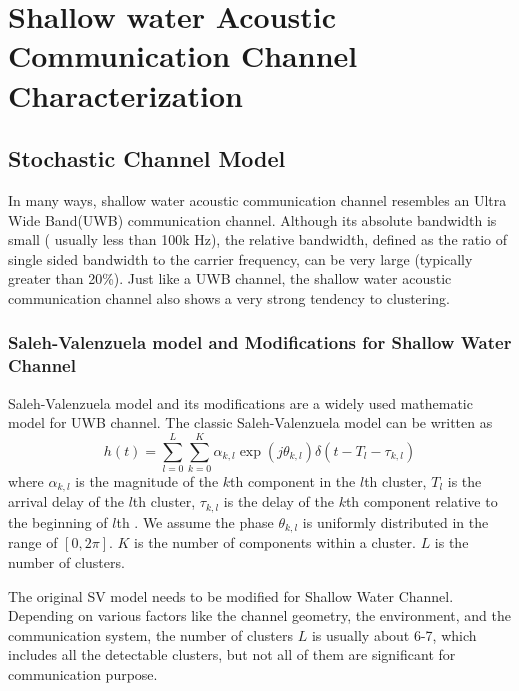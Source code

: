 
\chapter{Shallow water Acoustic Communication Channel Characterization}

\section{Stochastic Channel Model}
In many ways, shallow water acoustic communication channel resembles
an Ultra Wide Band(UWB) communication channel. Although its absolute
bandwidth is small ( usually less than 100k Hz), the relative
bandwidth, defined as the ratio of single sided bandwidth to the
carrier frequency, can be very large (typically greater than 20\%).
Just like a UWB channel, the shallow water acoustic communication
channel also shows a very strong tendency to clustering.

\subsection{Saleh-Valenzuela model and Modifications for Shallow
Water Channel}

Saleh-Valenzuela model and its modifications are a widely used
mathematic model for UWB channel. The classic Saleh-Valenzuela model
can be written as
\begin{equation}
h(t)=\sum_{l=0}^{L}\sum_{k=0}^{K}\alpha_{k,l}\exp(j\theta_{k,l})\delta(t-T_l-\tau_{k,l})
\end{equation}
where $\alpha_{k,l}$ is the magnitude of the $k$th component in the
$l$th cluster, $T_l$ is the arrival delay of the $l$th cluster,
$\tau_{k,l}$ is the delay of the $k$th component relative to the
beginning of  $l$th . We assume the phase $\theta_{k,l}$ is
uniformly distributed in the range of $[0, 2\pi]$. $K$ is the number
of components within a cluster. $L$ is the number of clusters.

The original SV model needs to be modified for Shallow Water
Channel. Depending on various factors like the channel geometry, the
environment, and the communication system, the number of clusters
$L$ is usually about 6-7, which includes all the detectable
clusters, but not all of them are significant for communication
purpose.

